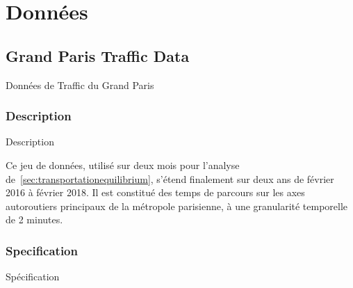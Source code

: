 \chapter{Données}



\label{app:data} %












\section{Grand Paris Traffic Data}{Données de Traffic du Grand Paris}


\subsection{Description}{Description}

Ce jeu de données, utilisé sur deux mois pour l'analyse de~\ref{sec:transportationequilibrium}, s'étend finalement sur deux ans de février 2016 à février 2018. Il est constitué des temps de parcours sur les axes autoroutiers principaux de la métropole parisienne, à une granularité temporelle de 2 minutes.

\subsection{Specification}{Spécification}


